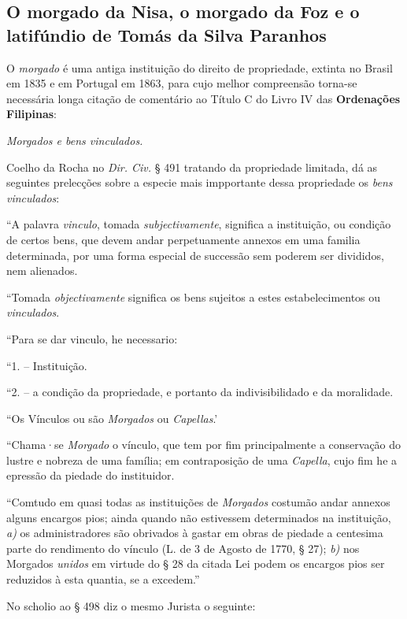 \subsection{O morgado da Nisa, o morgado da Foz e o latifúndio de Tomás da Silva Paranhos}\label{subsec:paranhos}

O \textit{morgado} é uma antiga instituição do direito de propriedade, extinta no Brasil em 1835 e em Portugal em 1863, para cujo melhor compreensão torna-se necessária longa citação de comentário ao Título C do Livro IV das \textbf{Ordenações Filipinas}: 

\begin{citacao}
\textit{Morgados e bens vinculados.}

Coelho da Rocha no \textit{Dir. Civ.} § 491 tratando da propriedade limitada, dá as seguintes prelecções sobre a especie mais impportante dessa propriedade os \textit{bens vinculados}:

``A palavra \textit{vinculo}, tomada \textit{subjectivamente}, significa a instituição, ou condição de certos bens, que devem andar perpetuamente annexos em uma familia determinada, por uma forma especial de successão sem poderem ser divididos, nem alienados.

``Tomada \textit{objectivamente} significa os bens sujeitos a estes estabelecimentos ou \textit{vinculados}.

``Para se dar vinculo, he necessario:

``1. -- Instituição.

``2. -- a condição da propriedade, e portanto da indivisibilidado e da moralidade.

``Os Vínculos ou são \textit{Morgados} ou \textit{Capellas}.'

``Chama·se \textit{Morgado} o vínculo, que tem por fim principalmente a conservação do lustre e nobreza de uma família; em contraposição de uma \textit{Capella}, cujo fim he a epressão da piedade do instituidor.

``Comtudo em quasi todas as instituições de \textit{Morgados} costumão andar annexos alguns encargos pios; ainda quando não estivessem determinados na instituição, \textit{a)} os administradores são obrivados à gastar em obras de piedade a centesima parte do rendimento do vínculo (L. de 3 de Agosto de 1770, § 27); \textit{b)} nos Morgados \textit{unidos} em virtude do § 28 da citada Lei podem os encargos pios ser reduzidos à esta quantia, se a excedem.''

No scholio ao § 498 diz o mesmo Jurista o seguinte:


\end{citacao}
